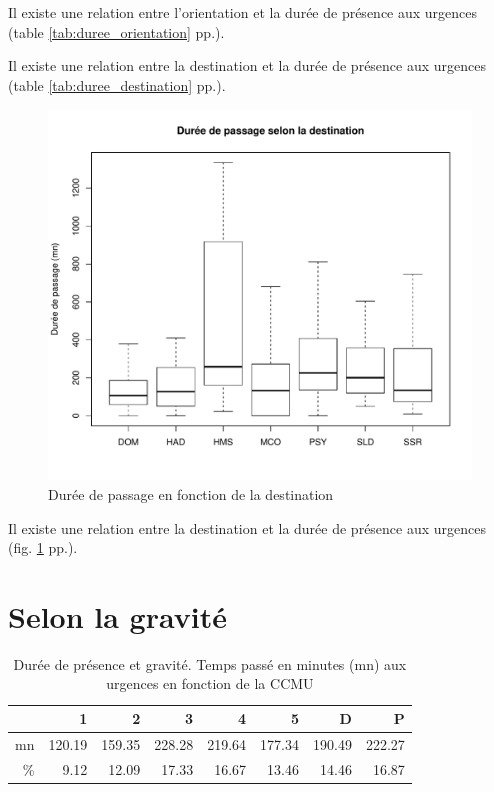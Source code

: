 \documentclass[12pt,english,french,twoside]{book}\usepackage[]{graphicx}\usepackage[]{color}
\makeatletter
\def\maxwidth{ %
  \ifdim\Gin@nat@width>\linewidth
    \linewidth
  \else
    \Gin@nat@width
  \fi
}
\newenvironment{knitrout}{}{} %
\makeatother
\begin{document}
Il existe une relation entre l'orientation et la durée de présence aux urgences (table \ref{tab:duree_orientation} pp.\pageref{tab:duree_orientation}).

Il existe une relation entre la destination et la durée de présence aux urgences (table \ref{tab:duree_destination} pp.\pageref{tab:duree_destination}).

\begin{figure}[ht!]
 \centering
\begin{knitrout}
\color{fgcolor}
\includegraphics[width=\maxwidth]{figure/bp_duree_dest} 

\end{knitrout}

 \caption{Durée de passage en fonction de la destination}
 \label{duree_dest}
\end{figure}
Il existe une relation entre la destination et la durée de présence aux urgences (fig. \ref{duree_dest} pp.\pageref{duree_dest}).


\section{Selon la gravité}

\begin{table}[ht]
\centering
\begin{tabular}{rrrrrrrr}
  \hline
 & 1 & 2 & 3 & 4 & 5 & D & P \\ 
  \hline
mn & 120.19 & 159.35 & 228.28 & 219.64 & 177.34 & 190.49 & 222.27 \\ 
  \% & 9.12 & 12.09 & 17.33 & 16.67 & 13.46 & 14.46 & 16.87 \\ 
   \hline
\end{tabular}
\caption[Durée de présence et gravité]{Durée de présence et gravité. Temps passé en minutes (mn) aux urgences en fonction de la CCMU} 
\label{duree_gravite}
\end{table}
\end{document}

